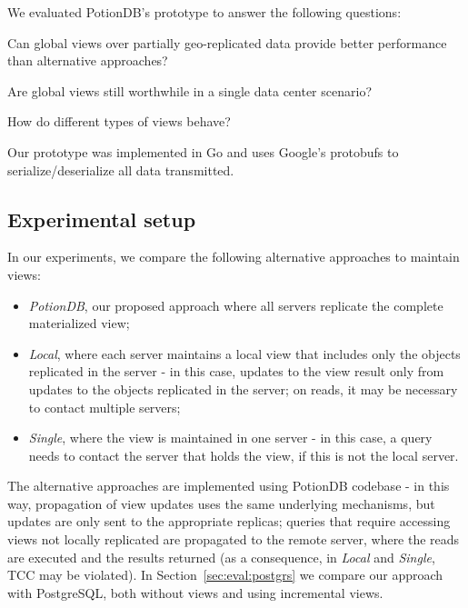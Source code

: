 \documentclass[sigplan,twocolumn,review,anonymous]{acmart}
\begin{document}
We evaluated PotionDB's prototype to answer the following questions: 
\begin{enumerate*}[label=(\roman*)]
	\item  \label{enum:q1} Can global views over partially geo-replicated data provide better performance than alternative approaches? 	     
	\item \label{enum:q2} Are global views still worthwhile in a single data center scenario?
	\item \label{enum:q3} How do different types of views behave? 
\end{enumerate*}

Our prototype was implemented in Go and uses Google's protobufs to serialize/deserialize all data transmitted.

\subsection{Experimental setup}
\label{subsec:setup}

In our experiments, we compare the following alternative approaches to maintain views:
\begin{itemize}[leftmargin=*,noitemsep,topsep=0pt,parsep=0pt,partopsep=0pt]
	\item \emph{PotionDB}, our proposed approach where all servers replicate the complete materialized view;
	\item \emph{Local}, where each server maintains a local view that includes only the objects replicated in the server - in this case, 
	updates to the view result only from updates to the objects replicated in the server; 
	on reads, it may be necessary to contact multiple servers;
	\item \emph{Single}, where the view is maintained in one server - in this case, a query needs to 
	contact the server that holds the view, if this is not the local server. 
\end{itemize}
The alternative approaches are implemented using PotionDB codebase - in this way, propagation of view updates uses the same underlying mechanisms, but updates are only sent to the appropriate replicas; queries that require accessing views not locally replicated are propagated to the remote server, where the reads are executed and the results returned (as a consequence, in \textit{Local} and \textit{Single}, TCC may be violated).
In Section~\ref{sec:eval:postgrs} we compare our approach with PostgreSQL, both without views and using incremental views.
\end{document}
